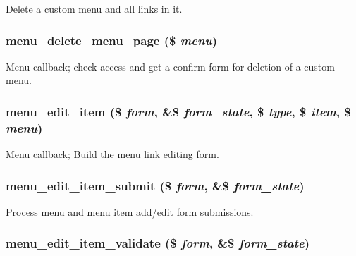\label{menu_8admin_8inc_a072747a64b798d6967fbf81e046a5475}
Delete a custom menu and all links in it. \hypertarget{menu_8admin_8inc_af56ae21f49fb3d481e215ad875f9b4f2}{
\subsubsection[{menu\_\-delete\_\-menu\_\-page}]{\setlength{\rightskip}{0pt plus 5cm}menu\_\-delete\_\-menu\_\-page (\$ {\em menu})}}
\label{menu_8admin_8inc_af56ae21f49fb3d481e215ad875f9b4f2}
Menu callback; check access and get a confirm form for deletion of a custom menu. \hypertarget{menu_8admin_8inc_a02b06886e2d1d1ad4b019f7691b43710}{
\subsubsection[{menu\_\-edit\_\-item}]{\setlength{\rightskip}{0pt plus 5cm}menu\_\-edit\_\-item (\$ {\em form}, \/  \&\$ {\em form\_\-state}, \/  \$ {\em type}, \/  \$ {\em item}, \/  \$ {\em menu})}}
\label{menu_8admin_8inc_a02b06886e2d1d1ad4b019f7691b43710}
Menu callback; Build the menu link editing form. \hypertarget{menu_8admin_8inc_a78694e41c7d0ed5105c324ca52974cb8}{
\subsubsection[{menu\_\-edit\_\-item\_\-submit}]{\setlength{\rightskip}{0pt plus 5cm}menu\_\-edit\_\-item\_\-submit (\$ {\em form}, \/  \&\$ {\em form\_\-state})}}
\label{menu_8admin_8inc_a78694e41c7d0ed5105c324ca52974cb8}
Process menu and menu item add/edit form submissions. \hypertarget{menu_8admin_8inc_a9b3b72516acaba98b8be3965616cc735}{
\subsubsection[{menu\_\-edit\_\-item\_\-validate}]{\setlength{\rightskip}{0pt plus 5cm}menu\_\-edit\_\-item\_\-validate (\$ {\em form}, \/  \&\$ {\em form\_\-state})}}
